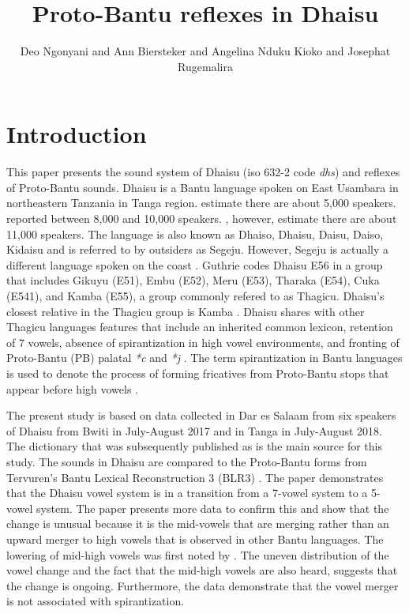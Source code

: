 \documentclass[output=paper,colorlinks,citecolor=brown]{langscibook}
\author{Deo Ngonyani\affiliation{Michigan State University} and Ann Biersteker\affiliation{Michigan State University} and Angelina Nduku Kioko\affiliation{US International University-Africa} and  Josephat Rugemalira\affiliation{Tumaini University Dar es Salaam College}}
\title{Proto-Bantu reflexes in Dhaisu}
\begin{document}
\maketitle

\section{Introduction}\label{sec:ngonyani:1}

This paper presents the sound system of Dhaisu (iso 632-2 code \textit{dhs}) and reflexes of Proto-Bantu sounds. Dhaisu is a Bantu language spoken on East Usambara in northeastern Tanzania in Tanga region. \citet{SimonsFennig2017} estimate there are about 5,000 speakers. \citet[17]{Nurse2000} reported between 8,000 and 10,000 speakers. \citet[2]{RugemaliraEtAl2019}, however, estimate there are about 11,000 speakers. The language is also known as Dhaiso, Dhaisu, Daisu, Daiso, Kidaisu and is referred to by outsiders as Segeju. However, Segeju is actually a different language spoken on the coast \citep{Nurse1982}. Guthrie codes Dhaisu E56 \citep{Guthrie1967, Maho2009} in a group that includes Gikuyu (E51), Embu (E52), Meru (E53), Tharaka (E54), Cuka (E541), and Kamba (E55), a group commonly refered to as Thagicu. Dhaisu's closest relative in the Thagicu group is Kamba \citep{Nurse1982, Nurse2000, Nurse1999}. Dhaisu shares with other Thagicu languages features that include an inherited common lexicon, retention of 7 vowels, absence of spirantization in high vowel environments, and fronting of Proto-Bantu (PB) palatal \textit{*c} and \textit{*j} \citep{Nurse1982}. The term spirantization in Bantu languages is used to denote the process of forming fricatives from Proto-Bantu stops that appear before high vowels  \citep{Nurse1982, Schadeberg1995}. 

The present study is based on data collected in Dar es Salaam from six  speakers of Dhaisu from Bwiti in July-August 2017 and in Tanga in July-August 2018. The dictionary that was subsequently published as \citet{RugemaliraEtAl2019} is the main source for this study. The sounds in Dhaisu are compared to the Proto-Bantu forms from Tervuren's Bantu Lexical Reconstruction 3 (BLR3) \citep{BastinEtAl2002}. The paper demonstrates that the Dhaisu vowel system is in a transition from a 7-vowel system to a 5-vowel system. The paper presents more data to confirm this and show that the change is unusual because it is the mid-vowels that are merging rather than an upward merger to high vowels that is observed in other Bantu languages. The lowering of mid-high vowels was first noted by \citet{Nurse2000}. The uneven distribution of the vowel change and the fact that the mid-high vowels are also heard, suggests that the change is ongoing. Furthermore, the data demonstrate that the vowel merger is not associated with spirantization.
\end{document}
